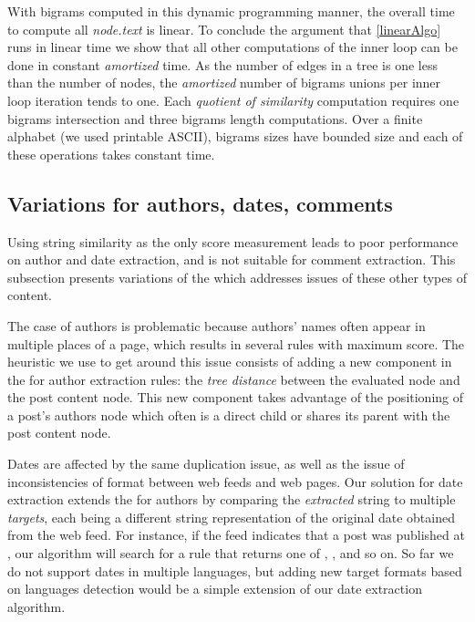 With bigrams computed in this dynamic programming manner, the overall 
time to compute all \code{(}\emph{node.text}\code{)} 
is linear. To conclude the argument that \autoref{linearAlgo} runs in linear 
time we show that all other computations of the inner loop can be done 
in constant \emph{amortized} time. As the number of edges in a tree is 
one less than the number of nodes, the \emph{amortized} number of bigrams 
unions per inner loop iteration tends to one. Each \emph{quotient of 
similarity} computation requires one bigrams intersection and three 
bigrams length computations. Over a finite alphabet (we used printable 
ASCII), bigrams sizes have bounded size and each of these operations 
takes constant time.

\subsection{Variations for authors, dates, comments}
\label{variationsforauthorsdatesandcomments}

Using string similarity as the only score measurement leads to poor 
performance on author and date extraction, and is not suitable for 
comment extraction. This subsection presents variations of the 
 which addresses issues of these other types of content.

The case of authors is problematic because authors' names often appear in 
multiple places of a page, which results in several rules with maximum 
 score. The heuristic we use to get around this 
issue consists of adding a new component in the  for 
author extraction rules: the \emph{tree distance} between the evaluated 
node and the post content node. This new component takes advantage of 
the positioning of a post's authors node which often is a direct child 
or shares its parent with the post content node.

Dates are affected by the same duplication issue, as well as the issue of 
inconsistencies of format between web feeds and web pages. Our solution 
for date extraction extends the  for authors by 
comparing the \emph{extracted} string to multiple \emph{targets}, each 
being a different string representation of the original date obtained 
from the web feed. For instance, if the feed indicates that a post was 
published at , our algorithm 
will search for a rule that returns one of , ,  and so on. So far we do not support dates in multiple languages, 
but adding new target formats based on languages detection would be a 
simple extension of our date extraction algorithm.


